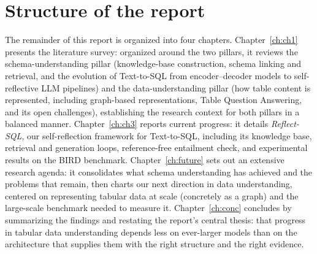 \section{Structure of the report}
The remainder of this report is organized into four chapters. Chapter~\ref{ch:ch1} presents the literature survey: organized around the two pillars, it reviews the schema-understanding pillar (knowledge-base construction, schema linking and retrieval, and the evolution of Text-to-SQL from encoder--decoder models to self-reflective LLM pipelines) and the data-understanding pillar (how table content is represented, including graph-based representations, Table Question Answering, and its open challenges), establishing the research context for both pillars in a balanced manner. Chapter~\ref{ch:ch3} reports current progress: it details \emph{Reflect-SQL}, our self-reflection framework for Text-to-SQL, including its knowledge base, retrieval and generation loops, reference-free entailment check, and experimental results on the BIRD benchmark. Chapter~\ref{ch:future} sets out an extensive research agenda: it consolidates what schema understanding has achieved and the problems that remain, then charts our next direction in data understanding, centered on representing tabular data at scale (concretely as a graph) and the large-scale benchmark needed to measure it. Chapter~\ref{ch:conc} concludes by summarizing the findings and restating the report's central thesis: that progress in tabular data understanding depends less on ever-larger models than on the architecture that supplies them with the right structure and the right evidence.

